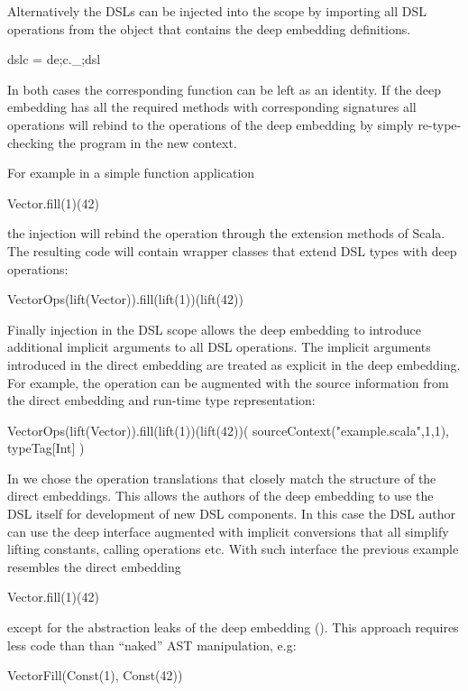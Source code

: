 Alternatively the DSLs can be injected into the scope by importing all DSL operations
 from the object that contains the deep embedding definitions.

  \infyyax{}
    {dsl}{\;\;c \; = \; \;\;de;\;\;\;\;\;c.\_;\;\;\;dsl}

In both cases the corresponding  function can be left as an
identity. If the deep embedding has all the required methods with corresponding
 signatures all operations will rebind to the
operations of the deep embedding by simply re-type-checking the program in the new context.

For example in a simple function application\begin{lstparagraph}
Vector.fill(1)(42)
\end{lstparagraph}the injection will rebind the operation through the extension methods of Scala. The
resulting code will contain wrapper classes that extend DSL types with deep operations:\begin{lstparagraph}
VectorOps(lift(Vector)).fill(lift(1))(lift(42))
\end{lstparagraph}

Finally injection in the DSL scope allows the deep embedding to introduce additional implicit arguments to
 all DSL operations. The implicit arguments introduced in the direct embedding are treated
 as explicit in the deep embedding. For example, the  operation can be augmented
 with the source information from the direct embedding and run-time type representation:\begin{lstparagraph}
VectorOps(lift(Vector)).fill(lift(1))(lift(42))(
  sourceContext("example.scala",1,1), typeTag[Int]
)
\end{lstparagraph}

In \yy we chose the operation translations that closely match the structure of
 the direct embeddings. This allows the authors of the deep embedding to use the
 DSL itself for development of new DSL components. In this case the DSL author can use
 the deep interface augmented with implicit conversions that all simplify lifting constants,
 calling operations etc. With such interface the previous example resembles the direct embedding\begin{lstparagraph}
Vector.fill(1)(42)
\end{lstparagraph}
except for the abstraction leaks of the deep embedding ().
This approach requires less code than than ``naked'' AST manipulation, e.g:\begin{lstparagraph}
VectorFill(Const(1), Const(42))
\end{lstparagraph}

